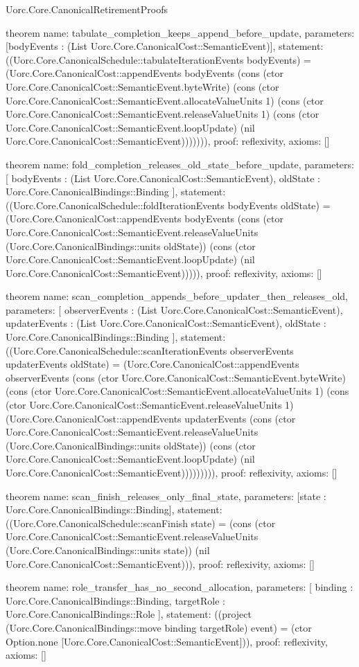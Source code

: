 \begin{lexlean}{Uorc.Core.CanonicalRetirementProofs}
\begin{semanticmodule}
theorem{
  name: tabulate_completion_keeps_append_before_update,
  parameters: [bodyEvents : (List Uorc.Core.CanonicalCost::SemanticEvent)],
  statement: ((Uorc.Core.CanonicalSchedule::tabulateIterationEvents bodyEvents) = (Uorc.Core.CanonicalCost::appendEvents bodyEvents (cons (ctor Uorc.Core.CanonicalCost::SemanticEvent.byteWrite) (cons (ctor Uorc.Core.CanonicalCost::SemanticEvent.allocateValueUnits 1) (cons (ctor Uorc.Core.CanonicalCost::SemanticEvent.releaseValueUnits 1) (cons (ctor Uorc.Core.CanonicalCost::SemanticEvent.loopUpdate) (nil Uorc.Core.CanonicalCost::SemanticEvent))))))),
  proof: reflexivity{},
  axioms: []
}

theorem{
  name: fold_completion_releases_old_state_before_update,
  parameters: [
    bodyEvents : (List Uorc.Core.CanonicalCost::SemanticEvent),
    oldState : Uorc.Core.CanonicalBindings::Binding
  ],
  statement: ((Uorc.Core.CanonicalSchedule::foldIterationEvents bodyEvents oldState) = (Uorc.Core.CanonicalCost::appendEvents bodyEvents (cons (ctor Uorc.Core.CanonicalCost::SemanticEvent.releaseValueUnits (Uorc.Core.CanonicalBindings::units oldState)) (cons (ctor Uorc.Core.CanonicalCost::SemanticEvent.loopUpdate) (nil Uorc.Core.CanonicalCost::SemanticEvent))))),
  proof: reflexivity{},
  axioms: []
}

theorem{
  name: scan_completion_appends_before_updater_then_releases_old,
  parameters: [
    observerEvents : (List Uorc.Core.CanonicalCost::SemanticEvent),
    updaterEvents : (List Uorc.Core.CanonicalCost::SemanticEvent),
    oldState : Uorc.Core.CanonicalBindings::Binding
  ],
  statement: ((Uorc.Core.CanonicalSchedule::scanIterationEvents observerEvents updaterEvents oldState) = (Uorc.Core.CanonicalCost::appendEvents observerEvents (cons (ctor Uorc.Core.CanonicalCost::SemanticEvent.byteWrite) (cons (ctor Uorc.Core.CanonicalCost::SemanticEvent.allocateValueUnits 1) (cons (ctor Uorc.Core.CanonicalCost::SemanticEvent.releaseValueUnits 1) (Uorc.Core.CanonicalCost::appendEvents updaterEvents (cons (ctor Uorc.Core.CanonicalCost::SemanticEvent.releaseValueUnits (Uorc.Core.CanonicalBindings::units oldState)) (cons (ctor Uorc.Core.CanonicalCost::SemanticEvent.loopUpdate) (nil Uorc.Core.CanonicalCost::SemanticEvent))))))))),
  proof: reflexivity{},
  axioms: []
}

theorem{
  name: scan_finish_releases_only_final_state,
  parameters: [state : Uorc.Core.CanonicalBindings::Binding],
  statement: ((Uorc.Core.CanonicalSchedule::scanFinish state) = (cons (ctor Uorc.Core.CanonicalCost::SemanticEvent.releaseValueUnits (Uorc.Core.CanonicalBindings::units state)) (nil Uorc.Core.CanonicalCost::SemanticEvent))),
  proof: reflexivity{},
  axioms: []
}

theorem{
  name: role_transfer_has_no_second_allocation,
  parameters: [
    binding : Uorc.Core.CanonicalBindings::Binding,
    targetRole : Uorc.Core.CanonicalBindings::Role
  ],
  statement: ((project (Uorc.Core.CanonicalBindings::move binding targetRole) event) = (ctor Option.none [Uorc.Core.CanonicalCost::SemanticEvent])),
  proof: reflexivity{},
  axioms: []
}
\end{semanticmodule}
\end{lexlean}
